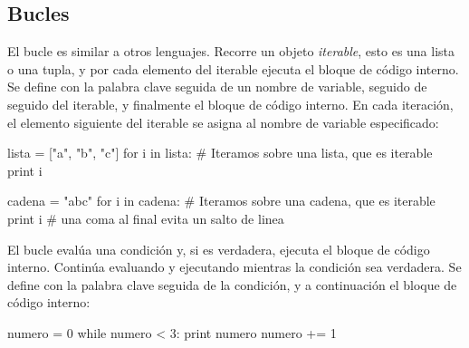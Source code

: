 \subsection{Bucles}
El bucle  es similar a  otros lenguajes. Recorre un objeto \emph{iterable},
esto es  una lista o una tupla, y por cada elemento del iterable 
ejecuta el bloque de código interno. 
Se define con la palabra clave  seguida de un nombre de variable, 
seguido de  seguido del iterable, y finalmente el bloque de código interno. 
En cada iteración, el elemento siguiente del iterable se asigna al nombre de variable 
especificado:

\begin{pyconsole}
lista = ["a", "b", "c"]
for i in lista: # Iteramos sobre una lista, que es iterable
    print i

cadena = "abc"
for i in cadena: # Iteramos sobre una cadena, que es iterable
    print i # una coma al final evita un salto de linea

\end{pyconsole}



El bucle  evalúa una condición y, si es verdadera, ejecuta el bloque
de código interno. Continúa evaluando y ejecutando mientras la condición sea verdadera.
Se define con la palabra clave  seguida de la condición, y a continuación 
el bloque de código interno:
\begin{pyconsole}
numero = 0
while numero < 3:
    print numero
    numero += 1  

\end{pyconsole}


% 
%  
%  
% 
% 
% 





